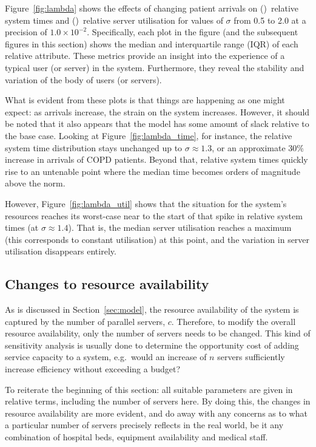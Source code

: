 Figure~\ref{fig:lambda} shows the effects of changing patient arrivals on
()~relative system times and
()~relative server utilisation for values of \(\sigma\)
from 0.5 to 2.0 at a precision of \(1.0 \times 10^{-2}\). Specifically, each
plot in the figure (and the subsequent figures in this section) shows the median
and interquartile range (IQR) of each relative attribute. These metrics provide
an insight into the experience of a typical user (or server) in the system.
Furthermore, they reveal the stability and variation of the body of users
(or servers).

What is evident from these plots is that things are happening as one might
expect: as arrivals increase, the strain on the system increases. However, it
should be noted that it also appears that the model has some amount of slack
relative to the base case. Looking at Figure~\ref{fig:lambda_time}, for
instance, the relative system time distribution stays unchanged up to \(\sigma
\approx 1.3\), or an approximate 30\% increase in arrivals of COPD patients.
Beyond that, relative system times quickly rise to an untenable point where the
median time becomes orders of magnitude above the norm.

However, Figure~\ref{fig:lambda_util} shows that the situation for the system's
resources reaches its worst-case near to the start of that spike in relative
system times (at \(\sigma \approx 1.4\)). That is, the median server utilisation
reaches a maximum (this corresponds to constant utilisation) at this point, and
the variation in server utilisation disappears entirely.


\subsection{Changes to resource availability}\label{subsec:resources}

As is discussed in Section~\ref{sec:model}, the resource availability of the
system is captured by the number of parallel servers, \(c\). Therefore, to
modify the overall resource availability, only the number of servers needs to be
changed. This kind of sensitivity analysis is usually done to determine the
opportunity cost of adding service capacity to a system, e.g.\ would an increase
of \(n\) servers sufficiently increase efficiency without exceeding a budget?

To reiterate the beginning of this section: all suitable parameters are given in
relative terms, including the number of servers here. By doing this, the changes
in resource availability are more evident, and do away with any concerns as to
what a particular number of servers precisely reflects in the real world, be it
any combination of hospital beds, equipment availability and medical staff.

